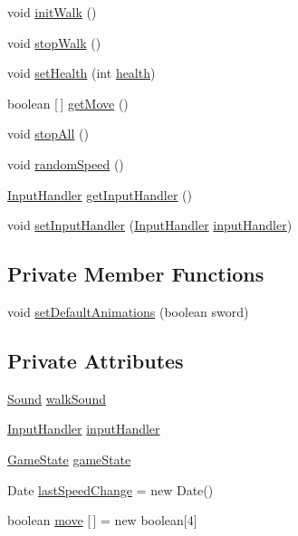 \begin{DoxyCompactItemize}
\item 
void \mbox{\hyperlink{classentities_1_1_player_a72636c420f2cbca51ada895c6d948cdf}{init\+Walk}} ()
\item 
void \mbox{\hyperlink{classentities_1_1_player_a85565dfb7b3f26180d56992f90b88d56}{stop\+Walk}} ()
\item 
void \mbox{\hyperlink{classentities_1_1_player_a3d96b84a313d4ab5278223c2e0a7df35}{set\+Health}} (int \mbox{\hyperlink{classentities_1_1_subject_a8285660fdae3f0b220bbc686cf5c012c}{health}})
\item 
boolean \mbox{[}$\,$\mbox{]} \mbox{\hyperlink{classentities_1_1_player_ae56a2b518ab7feca8267a1f07c0d7f62}{get\+Move}} ()
\item 
void \mbox{\hyperlink{classentities_1_1_player_adc49b9d4f92d988724264ff27f2225d8}{stop\+All}} ()
\item 
void \mbox{\hyperlink{classentities_1_1_player_a0735d0ed04f027c6c4caa2816771a316}{random\+Speed}} ()
\item 
\mbox{\hyperlink{classentities_1_1_input_handler}{Input\+Handler}} \mbox{\hyperlink{classentities_1_1_player_afddc465ed5f94a8137b90790e815ecea}{get\+Input\+Handler}} ()
\item 
void \mbox{\hyperlink{classentities_1_1_player_a052aaf6746c2281916b121f3db9f5958}{set\+Input\+Handler}} (\mbox{\hyperlink{classentities_1_1_input_handler}{Input\+Handler}} \mbox{\hyperlink{classentities_1_1_player_a56ed11dfad1144c333bb21762ff6122e}{input\+Handler}})
\end{DoxyCompactItemize}
\subsection*{Private Member Functions}
\begin{DoxyCompactItemize}
\item 
void \mbox{\hyperlink{classentities_1_1_player_ad14066cb09a88306ecedb44f7f9f9e60}{set\+Default\+Animations}} (boolean sword)
\end{DoxyCompactItemize}
\subsection*{Private Attributes}
\begin{DoxyCompactItemize}
\item 
\mbox{\hyperlink{classorg_1_1newdawn_1_1slick_1_1_sound}{Sound}} \mbox{\hyperlink{classentities_1_1_player_a79a5a286c847ddeebb54102f66b009a0}{walk\+Sound}}
\item 
\mbox{\hyperlink{classentities_1_1_input_handler}{Input\+Handler}} \mbox{\hyperlink{classentities_1_1_player_a56ed11dfad1144c333bb21762ff6122e}{input\+Handler}}
\item 
\mbox{\hyperlink{classstates_1_1_game_state}{Game\+State}} \mbox{\hyperlink{classentities_1_1_player_a5c0c41f4ba8b9647580089c5314cd3a6}{game\+State}}
\item 
Date \mbox{\hyperlink{classentities_1_1_player_aa19245e93679111fca5ca4458fecee53}{last\+Speed\+Change}} = new Date()
\item 
boolean \mbox{\hyperlink{classentities_1_1_player_afbadbf8ec5ab49e6cbadb0d39f9ad6d1}{move}} \mbox{[}$\,$\mbox{]} = new boolean\mbox{[}4\mbox{]}
\end{DoxyCompactItemize}
